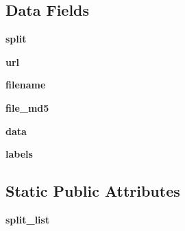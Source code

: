 \subsection*{Data Fields}
\begin{DoxyCompactItemize}
\item 
\mbox{\label{classtorchvision_1_1datasets_1_1svhn_1_1SVHN_abb1c65d1d2389260060fb7a2ad9b98b1}} 
{\bfseries split}
\item 
\mbox{\label{classtorchvision_1_1datasets_1_1svhn_1_1SVHN_a6153d91a11f0e00369ba0d436f675daa}} 
{\bfseries url}
\item 
\mbox{\label{classtorchvision_1_1datasets_1_1svhn_1_1SVHN_a50c6f5de1dc0a7c1aaa3711f1638a9ed}} 
{\bfseries filename}
\item 
\mbox{\label{classtorchvision_1_1datasets_1_1svhn_1_1SVHN_a3185391ff0488844fb36db27487333b1}} 
{\bfseries file\+\_\+md5}
\item 
\mbox{\label{classtorchvision_1_1datasets_1_1svhn_1_1SVHN_abaeb6f620a4c74f95a542ffb5da76d6a}} 
{\bfseries data}
\item 
\mbox{\label{classtorchvision_1_1datasets_1_1svhn_1_1SVHN_a3cdc8111ba033e3e0c8526c4047e9f43}} 
{\bfseries labels}
\end{DoxyCompactItemize}
\subsection*{Static Public Attributes}
\begin{DoxyCompactItemize}
\item 
\mbox{\label{classtorchvision_1_1datasets_1_1svhn_1_1SVHN_a0f9e43f1e97f0fb340342013885fc623}} 
{\bfseries split\+\_\+list}
\end{DoxyCompactItemize}


